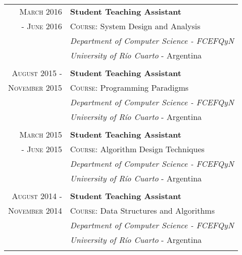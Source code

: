 \documentclass[a4paper,10pt]{article} %
\begin{document}
\begin{longtable}{rl}
\textsc{March 2016} & \textbf{Student Teaching Assistant} \\
\textsc{- June 2016} & \textsc{Course:} System Design and Analysis \\ & \textit{Department of Computer Science - FCEFQyN} \\  
& \textit{University of Río Cuarto} - Argentina \\ & \\

\textsc{August 2015 -} & \textbf{Student Teaching Assistant} \\
\textsc{November 2015} & \textsc{Course:} Programming Paradigms \\ & \textit{Department of Computer Science - FCEFQyN} \\  
& \textit{University of Río Cuarto} - Argentina \\ & \\

\textsc{March 2015} & \textbf{Student Teaching Assistant} \\
\textsc{- June 2015} & \textsc{Course:} Algorithm Design Techniques \\ & \textit{Department of Computer Science - FCEFQyN} \\ & \textit{University of Río Cuarto} - Argentina \\ & \\ 

\textsc{August 2014 -} & \textbf{Student Teaching Assistant} \\
\textsc{November 2014} & \textsc{Course:} Data Structures and Algorithms \\ & \textit{Department of Computer Science - FCEFQyN} \\ & \textit{University of Río Cuarto} - Argentina \\ & \\ 

\end{longtable}
\end{document}
